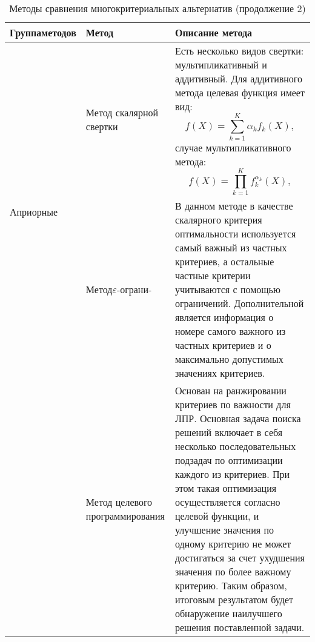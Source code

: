 \begin{table}[H]
	\centering
	\caption{Методы сравнения многокритериальных альтернатив (продолжение 2)}
	\label{mko_table_2}
	\begin{tabular}{|p{3.3cm}|p{2.4cm}|p{9.5cm}|}
		\hline
		\textbf{Группа\linebreak методов} & \textbf{Метод} & \textbf{Описание метода} \\
		\hline
		\multirow{2}{3.3cm}{Априорные} & Метод скалярной свертки & Есть несколько видов свертки: мультипликативный и аддитивный. Для аддитивного метода целевая функция имеет вид:
		\begin{equation}
			f(X) = \sum\limits_{k=1}^{K} \alpha_{k} f_{k}(X),
		\end{equation} случае мультипликативного метода:
		\begin{equation}
			f(X) = \prod_{k=1}^{K} f_{k}^{\alpha_{k}}(X),
		\end{equation}\\
		\cline{2-3} & Метод\linebreak$\varepsilon$-ограни- & В данном методе в качестве скалярного критерия оптимальности используется самый важный из частных критериев, а остальные частные критерии учитываются с помощью ограничений. Дополнительной является информация о номере самого важного из частных критериев и о максимально допустимых значениях критериев.\\
		\cline{2-3} & Метод целевого программирования & Основан на ранжировании критериев по важности для ЛПР. Основная задача поиска решений включает в себя несколько последовательных подзадач по оптимизации каждого из критериев. При этом такая оптимизация осуществляется согласно целевой функции, и улучшение значения по одному критерию не может достигаться за счет ухудшения значения по более важному критерию. Таким образом, итоговым результатом будет обнаружение наилучшего решения поставленной задачи. \\
		\hline
	\end{tabular}
\end{table}

